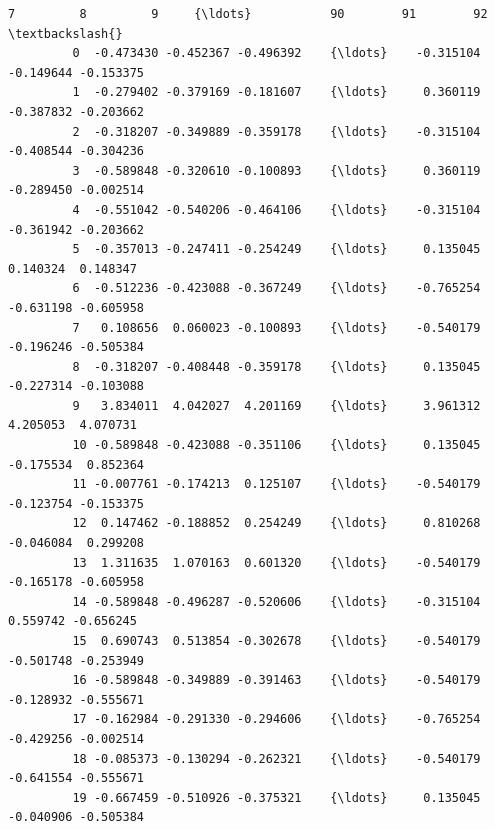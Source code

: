 \documentclass[11pt]{article}
\begin{document}
\begin{Verbatim}[commandchars=\\\{\}]
                   7         8         9     {\ldots}           90        91        92  \textbackslash{}
         0  -0.473430 -0.452367 -0.496392    {\ldots}    -0.315104 -0.149644 -0.153375   
         1  -0.279402 -0.379169 -0.181607    {\ldots}     0.360119 -0.387832 -0.203662   
         2  -0.318207 -0.349889 -0.359178    {\ldots}    -0.315104 -0.408544 -0.304236   
         3  -0.589848 -0.320610 -0.100893    {\ldots}     0.360119 -0.289450 -0.002514   
         4  -0.551042 -0.540206 -0.464106    {\ldots}    -0.315104 -0.361942 -0.203662   
         5  -0.357013 -0.247411 -0.254249    {\ldots}     0.135045  0.140324  0.148347   
         6  -0.512236 -0.423088 -0.367249    {\ldots}    -0.765254 -0.631198 -0.605958   
         7   0.108656  0.060023 -0.100893    {\ldots}    -0.540179 -0.196246 -0.505384   
         8  -0.318207 -0.408448 -0.359178    {\ldots}     0.135045 -0.227314 -0.103088   
         9   3.834011  4.042027  4.201169    {\ldots}     3.961312  4.205053  4.070731   
         10 -0.589848 -0.423088 -0.351106    {\ldots}     0.135045 -0.175534  0.852364   
         11 -0.007761 -0.174213  0.125107    {\ldots}    -0.540179 -0.123754 -0.153375   
         12  0.147462 -0.188852  0.254249    {\ldots}     0.810268 -0.046084  0.299208   
         13  1.311635  1.070163  0.601320    {\ldots}    -0.540179 -0.165178 -0.605958   
         14 -0.589848 -0.496287 -0.520606    {\ldots}    -0.315104  0.559742 -0.656245   
         15  0.690743  0.513854 -0.302678    {\ldots}    -0.540179 -0.501748 -0.253949   
         16 -0.589848 -0.349889 -0.391463    {\ldots}    -0.540179 -0.128932 -0.555671   
         17 -0.162984 -0.291330 -0.294606    {\ldots}    -0.765254 -0.429256 -0.002514   
         18 -0.085373 -0.130294 -0.262321    {\ldots}    -0.540179 -0.641554 -0.555671   
         19 -0.667459 -0.510926 -0.375321    {\ldots}     0.135045 -0.040906 -0.505384   
         

\end{Verbatim}
\end{document}
